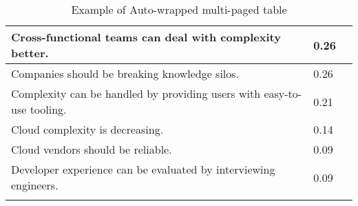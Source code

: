 \begin{longtable}{|p{10cm}|p{2cm}|p{2cm}|}
Cross-functional teams can deal with complexity better. & 0.26 \\ \hline
Companies should be breaking knowledge silos. & 0.26 \\ \hline
Complexity can be handled by providing users with easy-to-use tooling. & 0.21 \\ \hline
Cloud complexity is decreasing. & 0.14 \\ \hline
Cloud vendors should be reliable. & 0.09 \\ \hline
Developer experience can be evaluated by interviewing engineers. & 0.09 \\ \hline
\caption{Example of Auto-wrapped multi-paged table}
\label{tab:table1}
\end{longtable}
